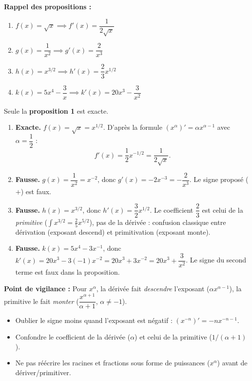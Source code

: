 \documentclass[11pt]{article}
\begin{document}
\begin{corrige}
\textbf{Rappel des propositions :}
\begin{enumerate}
    \item $f(x)=\sqrt{x} \implies f'(x)=\dfrac{1}{2\sqrt{x}}$
    \item $g(x)=\dfrac{1}{x^2} \implies g'(x)=\dfrac{2}{x^3}$
    \item $h(x)=x^{3/2} \implies h'(x)=\dfrac{2}{3}x^{1/2}$
    \item $k(x)=5x^4-\dfrac{3}{x} \implies k'(x)=20x^3-\dfrac{3}{x^2}$
\end{enumerate}
Seule la \textbf{proposition 1} est exacte.

\begin{enumerate}
    \item \textbf{Exacte.} $f(x)=\sqrt{x}=x^{1/2}$. D'après la formule $(x^\alpha)'=\alpha x^{\alpha-1}$ avec $\alpha=\dfrac12$ :
    \[ f'(x)=\frac12 x^{-1/2}=\frac{1}{2\sqrt{x}}. \]
    \item \textbf{Fausse.} $g(x)=\dfrac{1}{x^2}=x^{-2}$, donc $g'(x)=-2x^{-3}=-\dfrac{2}{x^3}$. Le signe proposé ($+$) est faux.
    \item \textbf{Fausse.} $h(x)=x^{3/2}$, donc $h'(x)=\dfrac32 x^{1/2}$. Le coefficient $\dfrac23$ est celui de la \emph{primitive} ($\int x^{3/2} = \frac{2}{5}x^{5/2}$), pas de la dérivée : confusion classique entre dérivation (exposant descend) et primitivation (exposant monte).
    \item \textbf{Fausse.} $k(x)=5x^4-3x^{-1}$, donc $k'(x)=20x^3-3(-1)x^{-2}=20x^3+3x^{-2}=20x^3+\dfrac{3}{x^2}$. Le signe du second terme est faux dans la proposition.
\end{enumerate}

\textbf{Point de vigilance :} Pour $x^\alpha$, la dérivée fait \emph{descendre} l'exposant ($\alpha x^{\alpha-1}$), la primitive le fait \emph{monter} ($\dfrac{x^{\alpha+1}}{\alpha+1}$, $\alpha\neq -1$).
\end{corrige}

\begin{attention}
\begin{itemize}
    \item Oublier le signe moins quand l'exposant est négatif : $(x^{-n})' = -n x^{-n-1}$.
    \item Confondre le coefficient de la dérivée ($\alpha$) et celui de la primitive ($1/(\alpha+1)$).
    \item Ne pas réécrire les racines et fractions sous forme de puissances ($x^\alpha$) avant de dériver/primitiver.
\end{itemize}
\end{attention}
\end{document}
